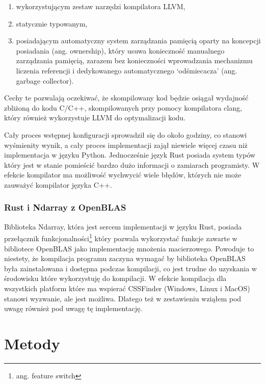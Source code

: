 \documentclass[11pt, a4paper]{article}
\begin{document}
\begin{sloppypar}
\begin{enumerate}
      \item wykorzystującym zestaw narzędzi kompilatora LLVM,

      \item statycznie typowanym,

      \item posiadającym automatyczny system zarządzania pamięcią oparty na koncepcji posiadania
        (ang. ownership), który usuwa konieczność manualnego zarządzania pamięcią,
        zarazem bez konieczności wprowadzania mechanizmu liczenia referencji i
        dedykowanego automatycznego `odśmiecacza' (ang. garbage collector).
    \end{enumerate}

    Cechy te pozwalają oczekiwać, że skompilowany kod będzie osiągał wydajność zbliżoną
    do kodu C/C++, skompilowanych przy pomocy kompilatora clang, który również
    wykorzystuje LLVM do optymalizacji kodu.

    Cały proces wstępnej konfiguracji sprowadził się do około godziny, co stanowi wyśmienity
    wynik, a cały proces implementacji zajął niewiele więcej czasu niż implementacja w
    języku Python. Jednocześnie język Rust posiada system typów który jest w stanie pomieścić
    bardzo dużo informacji o zamiarach programisty. W efekcie kompilator ma możliwość
    wychwycić wiele błędów, których nie może zauważyć kompilator języka C++.

    \subsubsection{Rust i Ndarray z OpenBLAS}
    Biblioteka Ndarray, która jest sercem implementacji w języku Rust, posiada przełącznik
    funkcjonalności\footnote{ang. feature switch} który pozwala wykorzystać funkcje
    zawarte w bibliotece OpenBLAS jako implementację mnożenia macierzowego. Powoduje to niestety,
    że kompilacja programu zaczyna wymagać by biblioteka OpenBLAS była zainstalowana i
    dostępna podczas kompilacji, co jest trudne do uzyskania w środowisku które wykorzystuję
    do kompilacji. W efekcie kompilacja dla wszystkich platform które ma wspierać
    CSSFinder (Windows, Linux i MacOS) stanowi wyzwanie, ale jest możliwa. Dlatego też w
    zestawieniu wziąłem pod uwagę również pod uwagę tę implementację.

    \section{Metody}

\end{sloppypar}
\end{document}
